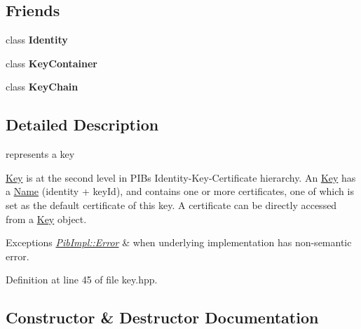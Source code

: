 \subsection*{Friends}
\begin{DoxyCompactItemize}
\item 
class {\bfseries Identity}\hypertarget{classndn_1_1security_1_1Key_a0356b07ec7295ba08eb3f7364cce24c3}{}\label{classndn_1_1security_1_1Key_a0356b07ec7295ba08eb3f7364cce24c3}

\item 
class {\bfseries Key\+Container}\hypertarget{classndn_1_1security_1_1Key_ab0f6d8e87c0bfe8bad96d644f6776370}{}\label{classndn_1_1security_1_1Key_ab0f6d8e87c0bfe8bad96d644f6776370}

\item 
class {\bfseries Key\+Chain}\hypertarget{classndn_1_1security_1_1Key_a4575cb0348247df0457c276b54b06764}{}\label{classndn_1_1security_1_1Key_a4575cb0348247df0457c276b54b06764}

\end{DoxyCompactItemize}


\subsection{Detailed Description}
represents a key 

\hyperlink{classndn_1_1security_1_1Key}{Key} is at the second level in P\+IB\textquotesingle{}s Identity-\/\+Key-\/\+Certificate hierarchy. An \hyperlink{classndn_1_1security_1_1Key}{Key} has a \hyperlink{classndn_1_1Name}{Name} (identity + key\+Id), and contains one or more certificates, one of which is set as the default certificate of this key. A certificate can be directly accessed from a \hyperlink{classndn_1_1security_1_1Key}{Key} object.


\begin{DoxyExceptions}{Exceptions}
{\em \hyperlink{classndn_1_1security_1_1PibImpl_1_1Error}{Pib\+Impl\+::\+Error}} & when underlying implementation has non-\/semantic error. \\
\hline
\end{DoxyExceptions}


Definition at line 45 of file key.\+hpp.



\subsection{Constructor \& Destructor Documentation}
